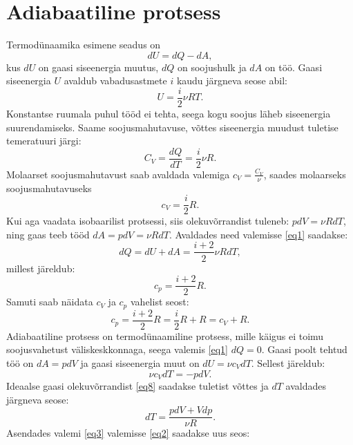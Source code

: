 \documentclass{trkut}%
\begin{document}
\section{Adiabaatiline protsess}
Termodünaamika esimene seadus on
\begin{equation}\label{eq1}
dU = dQ - dA ,
\end{equation}
kus $dU$ on gaasi siseenergia muutus, $dQ$ on soojushulk ja $dA$ on töö. Gaasi siseenergia $U$ avaldub vabadusastmete $i$ kaudu järgneva seose abil:
\begin{equation}\label{eq5}
U = \frac{i}{2} \nu R T.
\end{equation}
Konstantse ruumala puhul tööd ei tehta, seega kogu soojus läheb siseenergia suurendamiseks. Saame soojusmahutavuse, võttes siseenergia muudust tuletise temeratuuri järgi:
\begin{equation}\label{eq6}
C_V = \frac{dQ}{dT}=\frac{i}{2}\nu R .
\end{equation}
Molaarset soojusmahutavust saab avaldada valemiga $c_V = \frac{C_V}{\nu}$, saades molaarseks soojusmahutavuseks
\begin{equation}\label{eq7}
c_V = \frac{i}{2}R .
\end{equation}
Kui aga vaadata isobaarilist protsessi, siis olekuvõrrandist tuleneb: $pdV=\nu RdT$, ning gaas teeb tööd $dA = pdV = \nu RdT$. Avaldades need valemisse \ref{eq1} saadakse:
\begin{equation}
dQ = dU + dA = \frac{i+2}{2} \nu R dT ,
\end{equation}
millest järeldub:
\begin{equation}
c_p=\frac{i+2}{2}R.
\end{equation}
Samuti saab näidata $c_V$ ja $c_p$ vahelist seost:
\begin{equation}\label{eq9}
c_p =\frac{i+2}{2}R = \frac{i}{2}R + R = c_V + R.
\end{equation}
Adiabaatiline protsess on termodünaamiline protsess, mille käigus ei toimu soojusvahetust väliskeskkonnaga, seega valemis \ref{eq1} $dQ=0$. Gaasi poolt tehtud töö on $d A=pdV$ ja gaasi siseenergia muut on $dU=\nu c_VdT$. Sellest järeldub:
\begin{equation}\label{eq2}
\nu c_VdT = -pdV.
\end{equation}
Ideaalse gaasi olekuvõrrandist \ref{eq8} saadakse tuletist võttes ja $dT$ avaldades järgneva seose:
\begin{equation}\label{eq3}
dT = \frac{pdV+Vdp}{\nu R}.
\end{equation}
Asendades valemi \ref{eq3} valemisse \ref{eq2} saadakse uus seos:
\end{document}
